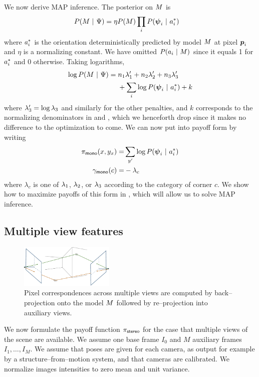 We now derive MAP inference. The posterior on $M$ is
\begin{align}
  \label{eq:mono-post}
  P(M ~|~ \Psi) = {} &
  \eta P(M) \prod_i P(\boldsymbol{\psi}_i ~|~ a_i^*)
\end{align}
where $a_i^*$ is the orientation deterministically predicted by
model $M$ at pixel $\boldsymbol{p}_i$ and $\eta$ is a normalizing
constant. We have omitted $P(a_i~|~M)$ since it equals
1 for $a_i^*$ and 0 otherwise. Taking logarithms,
\begin{align}
  \label{eq:mono-logpost}
  \begin{split}
    \log P(M ~|~ \Psi) = {} &
    n_1 \lambda_1' + n_2 \lambda_2' + n_3 \lambda_3'
    \\    
    & + \sum_i \log P(\boldsymbol{\psi}_i ~|~ a_i^*) + k
  \end{split}
\end{align}
where $\lambda_3'=\log \lambda_3$ and similarly for the other
penalties, and $k$ corresponds to the normalizing denominators in
 and , which we henceforth drop
since it makes no difference to the optimization to come. We can now
put  into payoff form  by writing
\begin{equation}
  \label{eq:mono-payoffs}
  \begin{split}
    \pi_{\textsf{mono}}(x,y_x) =&
    \sum_{y'} \log P(\boldsymbol{\psi}_i ~|~ a_i^*) \\
    \gamma_{\textsf{mono}}(c) =& -\lambda_c
  \end{split}
\end{equation}
where $\lambda_c$ is one of $\lambda_1$, $\lambda_2$, or
$\lambda_3$ according to the category of corner $c$. We show how to
maximize payoffs of this form in , which will allow
us to solve MAP inference.

\subsection{Multiple view features}
\begin{figure}[tb]
  \centering \includegraphics[width=0.4\textwidth]{figures/backproject}
  \caption{Pixel correspondences across multiple views are computed by
    back--projection onto the model $M$ followed by re--projection into
    auxiliary views.}
  \label{fig:backproject}
\end{figure}
We now formulate the payoff function $\pi_{\textsf{stereo}}$ for the case that
multiple views of the scene are available. We assume one base frame
$I_0$ and $M$ auxiliary frames $I_1,\ldots,I_M$. We assume that poses
are given for each camera, as output for example by a
structure--from--motion system, and that cameras are calibrated. We
normalize images intensities to zero mean and unit variance.

